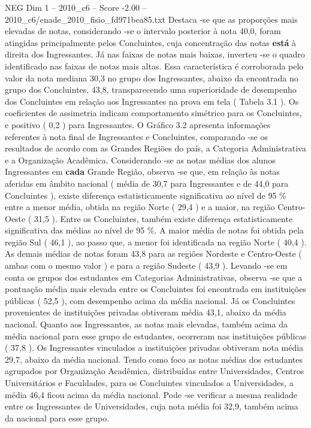 \begin{textsample}{NEG Dim 1 – 2010\_c6 – Score -2.00 – 2010\_c6/enade\_2010\_fisio\_fd971bea85.txt}
Destaca -se que as proporções mais elevadas de notas, considerando -se o intervalo posterior à nota 40,0, foram atingidas principalmente pelos Concluintes, cuja concentração das notas \textbf{está} à direita dos Ingressantes.
Já nas faixas de notas mais baixas, inverteu -se o quadro identificado nas faixas de notas mais altas.
Essa característica é corroborada pelo valor da nota mediana 30,3 no grupo dos Ingressantes, abaixo da encontrada no grupo dos Concluintes, 43,8, transparecendo uma superioridade de desempenho dos Concluintes em relação aos Ingressantes na prova em tela ( Tabela 3.1 ).
Os coeficientes de assimetria indicam comportamento simétrico para os Concluintes, e positivo ( 0,2 ) para Ingressantes.
O Gráfico 3.2 apresenta informações referentes à nota final de Ingressantes e Concluintes, comparando -se os resultados de acordo com as Grandes Regiões do país, a Categoria Administrativa e a Organização Acadêmica.
Considerando -se as notas médias dos alunos Ingressantes em \textbf{cada} Grande Região, observa -se que, em relação às notas aferidas em âmbito nacional ( média de 30,7 para Ingressantes e de 44,0 para Concluintes ), existe diferença estatisticamente significativa ao nível de 95 \% entre a menor média, obtida na região Norte ( 29,4 ) e a maior, na região Centro-Oeste ( 31,5 ).
Entre os Concluintes, também existe diferença estatisticamente significativa das médias ao nível de 95 \%.
A maior média de notas foi obtida pela região Sul ( 46,1 ), ao passo que, a menor foi identificada na região Norte ( 40,4 ).
As demais médias de notas foram 43,8 para as regiões Nordeste e Centro-Oeste ( ambas com o mesmo valor ) e para a região Sudeste ( 43,9 ).
Levando -se em conta os grupos dos estudantes em Categorias Administrativas, observa -se que a pontuação média mais elevada entre os Concluintes foi encontrada em instituições públicas ( 52,5 ), com desempenho acima da média nacional.
Já os Concluintes provenientes de instituições privadas obtiveram média 43,1, abaixo da média nacional.
Quanto aos Ingressantes, as notas mais elevadas, também acima da média nacional para esse grupo de estudantes, ocorreram nas instituições públicas ( 37,8 ).
Os Ingressantes vinculados a instituições privadas obtiveram nota média 29,7, abaixo da média nacional.
Tendo como foco as notas médias dos estudantes agrupados por Organização Acadêmica, distribuídas entre Universidades, Centros Universitários e Faculdades, para os Concluintes vinculados a Universidades, a média 46,4 ficou acima da média nacional.
Pode -se verificar a mesma realidade entre os Ingressantes de Universidades, cuja nota média foi 32,9, também acima da nacional para esse grupo.

\end{textsample}

